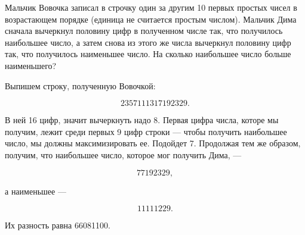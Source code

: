 
\begin{itemize}

\itC Мальчик Вовочка записал в строчку один за другим 10 первых простых чисел в возрастающем порядке (единица не считается простым числом). Мальчик Дима сначала вычеркнул половину цифр в полученном числе так, что получилось наибольшее число, а затем снова из этого же числа вычеркнул половину цифр так, что получилось наименьшее число. На сколько наибольшее число больше наименьшего?

\itr Выпишем строку, полученную Вовочкой:

\vspace{-0.4cm}
$$2357111317192329.$$

В ней 16 цифр, значит вычеркнуть надо 8. Первая цифра числа, которе мы получим, лежит среди первых 9 цифр строки — чтобы получить наибольшее число, мы должны максимизировать ее. Подойдет 7. Продолжая тем же образом, получим, что наибольшее число, которое мог получить Дима, —

\vspace{-0.4cm}
$$77192329,$$

а наименьшее —

\vspace{-0.4cm}
$$11111229.$$

Их разность равна 66081100.

\end{itemize}




